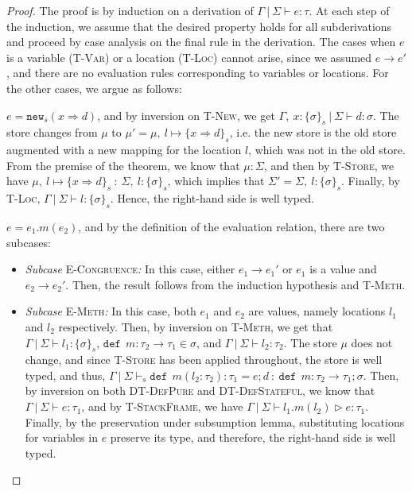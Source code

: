 \documentclass{llncs}
\newcommand{\keywadj}[1]{\mathtt{#1}}
\newcommand{\keyw}[1]{\keywadj{#1}~}
\newcommand{\pcase}[1][]{
  \if\relax\detokenize{#1}\relax
    \def\thiscase{}
  \else
    \def\thiscase{~#1}
  \fi
  \item
}
\begin{document}
\begin{proof} The proof is by induction on a derivation of $\Gamma~|~\Sigma \vdash e : \tau$. At each step of the induction, we assume that the desired property holds for all subderivations and proceed by case analysis on the final rule in the derivation. The cases when $e$ is a variable (\textsc{T-Var}) or a location (\textsc{T-Loc}) cannot arise, since we assumed $e \longrightarrow e'$, and there are no evaluation rules corresponding to variables or locations. For the other cases, we argue as follows:

\begin{pcases}
\pcase[\textsc{T-New}]
$e = \keywadj{new}_{s}(x \Rightarrow d)$, and by inversion on \textsc{T-New}, we get $\Gamma,~x : \{ \sigma \}_{s}~|~\Sigma \vdash d : \sigma$. The store changes from $\mu$ to $\mu' = \mu,~l \mapsto \{ x \Rightarrow d \}_s$, i.e. the new store is the old store augmented with a new mapping for the location $l$, which was not in the old store. From the premise of the theorem, we know that $\mu : \Sigma$, and then by \textsc{T-Store}, we have $\mu,~l \mapsto \{ x \Rightarrow d \}_s~:~\Sigma,~l : \{ \sigma \}_s$, which implies that $\Sigma' = \Sigma,~l : \{ \sigma \}_s$. Finally, by \textsc{T-Loc}, $\Gamma~|~\Sigma \vdash l : \{ \sigma \}_s$. Hence, the right-hand side is well typed.
\\
\pcase[\textsc{T-Meth}]
$e = e_1.m(e_2)$, and by the definition of the evaluation relation, there are two subcases:
\\
\begin{itemize}
\item[]  \textit{Subcase} \textsc{E-Congruence}\textit{:} In this case, either $e_1 \longrightarrow e_1'$ or $e_1$ is a value and $e_2 \longrightarrow e_2'$. Then, the result follows from the induction hypothesis and \textsc{T-Meth}.
\\
\item[]  \textit{Subcase} \textsc{E-Meth}\textit{:} In this case, both $e_1$ and $e_2$ are values, namely locations $l_1$ and $l_2$ respectively. Then, by inversion on \textsc{T-Meth}, we get that $\Gamma~|~\Sigma \vdash l_1 : \{\sigma\}_s$, $\keyw{def}~ m : \tau_2 \rightarrow \tau_1 \in \sigma$, and $\Gamma~|~\Sigma \vdash l_2 : \tau_2$. The store $\mu$ does not change, and since \textsc{T-Store} has been applied throughout, the store is well typed, and thus, \mbox{$\Gamma~|~\Sigma \vdash_s \keyw{def}~ m(l_2 : \tau_2) : \tau_1 = e; d~:~\keyw{def}~ m : \tau_2 \rightarrow \tau_1; \sigma$}. Then, by inversion on both \textsc{DT-DefPure} and \textsc{DT-DefStateful}, we know that $\Gamma~|~\Sigma \vdash e : \tau_1$, and by \textsc{T-StackFrame}, we have $\Gamma~|~\Sigma \vdash l_1.m(l_2) \rhd e : \tau_1$. Finally, by the preservation under subsumption lemma, substituting locations for variables in $e$ preserve its type, and therefore, the right-hand side is well typed.
\\
\end{itemize}


\end{pcases}
\end{proof}
\end{document}
